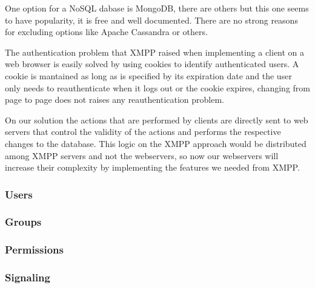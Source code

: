 \documentclass[
10pt, %
a4paper, %
oneside, %
]{scrartcl}
\begin{document}
One option for a NoSQL dabase is MongoDB, there are others but this one seems to have popularity, it is free and well documented. There are no strong reasons for excluding options like Apache Cassandra or others.

The authentication problem that XMPP raised when implementing a client on a web browser is easily solved by using cookies to identify authenticated users. A cookie is mantained as long as is specified by its expiration date and the user only needs to reauthenticate when it logs out or the cookie expires, changing from page to page does not raises any reauthentication problem.

On our solution the actions that are performed by clients are directly sent to web servers that control the validity of the actions and performs the respective changes to the database. This logic on the XMPP approach would be distributed among XMPP servers and not the webservers, so now our webservers will increase their complexity by implementing the features we needed from XMPP.

\subsubsection{Users}


\subsubsection{Groups}


\subsubsection{Permissions}


\subsubsection{Signaling}
\end{document}
